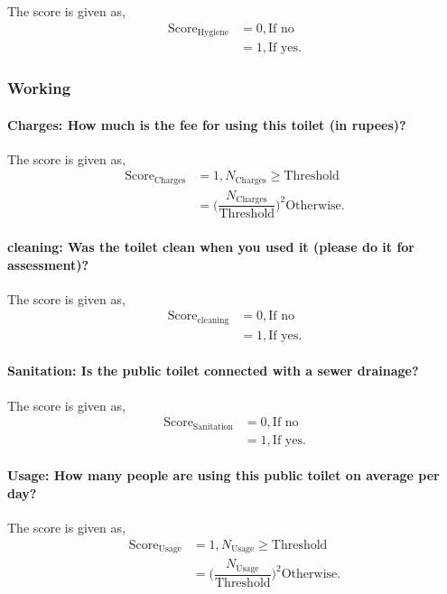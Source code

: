 \documentclass[oneside,twocolumn]{article}
\newcommand{\tsub}[2]{\text{#1}_{\text{#2}}}
\newcommand{\tsubb}[2]{#1_{\text{#2}}}
\begin{document}
The score is given as,
\begin{align*}
\tsub{Score}{Hygiene} &= 0, \text{If no} \\
        &= 1, \text{If yes}.
\end{align*}
\subsubsection{Working}

\paragraph{Charges: How much is the fee for using this toilet (in rupees)?}

The score is given as,
\begin{align*}
\tsub{Score}{Charges} &= 1, \tsubb{N}{Charges} \ge \text{Threshold} \\
        &=
\Big(\dfrac{\tsubb{N}{Charges}}{\text{Threshold}}\Big)^{2}
\text{Otherwise}.
\end{align*}
\paragraph{cleaning: Was the toilet clean when you used it (please do it for assessment)?}

The score is given as,
\begin{align*}
\tsub{Score}{cleaning} &= 0, \text{If no} \\
        &= 1, \text{If yes}.
\end{align*}
\paragraph{Sanitation: Is the public toilet connected with a sewer drainage?}

The score is given as,
\begin{align*}
\tsub{Score}{Sanitation} &= 0, \text{If no} \\
        &= 1, \text{If yes}.
\end{align*}
\paragraph{Usage: How many people are using this public toilet on average per day?}

The score is given as,
\begin{align*}
\tsub{Score}{Usage} &= 1, \tsubb{N}{Usage} \ge \text{Threshold} \\
        &=
\Big(\dfrac{\tsubb{N}{Usage}}{\text{Threshold}}\Big)^{2}
\text{Otherwise}.
\end{align*}
\end{document}
